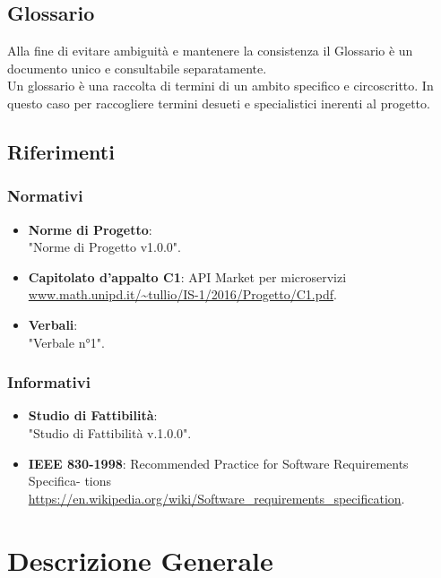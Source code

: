 \documentclass[12pt,a4paper,titlepage]{article}
\begin{document}
	\subsection{Glossario}
	Alla fine di evitare ambiguità e mantenere la consistenza il Glossario è un documento unico e consultabile separatamente.\\
	Un glossario è una raccolta di termini di un ambito specifico e circoscritto. In questo caso per raccogliere termini desueti e specialistici inerenti al progetto. 
	
	\subsection{Riferimenti}
	\subsubsection{Normativi}
	\begin{itemize}
		\item \textbf{Norme di Progetto}:\\	
		"Norme di Progetto v1.0.0".
		\item \textbf{Capitolato d'appalto C1}:	API Market per microservizi \\
		\textcolor{blue}{\url{www.math.unipd.it/~tullio/IS-1/2016/Progetto/C1.pdf}}. 
		\item \textbf{Verbali}:\\
		"Verbale n°1".
	\end{itemize}	
	\subsubsection{Informativi}
	\begin{itemize}
		\item \textbf {Studio di Fattibilità}:\\ 
		"Studio di Fattibilità v.1.0.0".
		\item \textbf{IEEE 830-1998}: Recommended Practice for Software Requirements Specifica- tions \\
		\textcolor{blue}{\url{https://en.wikipedia.org/wiki/Software_requirements_specification}}.
	\end{itemize}
	
	\newpage
	
	\section{Descrizione Generale}
\end{document}
